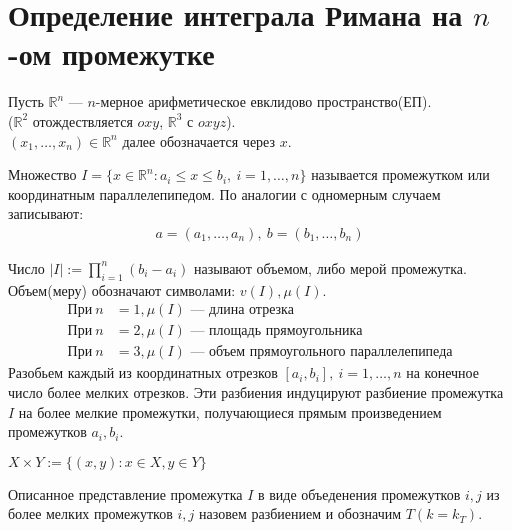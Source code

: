 \section{Определение интеграла Римана на $n$-ом промежутке}
Пусть $\mathbb{R}^n$ --- $n$-мерное арифметическое евклидово пространство(ЕП).
\\ ($\mathbb{R}^2$ отождествляется $oxy$, $\mathbb{R}^3$ с $oxyz$).\\
$(x_1, \dots, x_n) \in \mathbb{R}^n$ далее обозначается через $x$.

\begin{definition}
  Множество $I = \{x \in \mathbb{R}^n : a_i \leq x \leq b_i, \ i = 1, \dots, n\}$
  называется промежутком или координатным параллелепипедом. По аналогии с
  одномерным случаем записывают:
  \begin{gather*}
    a = (a_1, \dots, a_n), \ b = (b_1, \dots, b_n)
  \end{gather*}
\end{definition}

\begin{definition}
  Число $|I| := \prod\limits_{i=1}^{n} (b_i - a_i)$ называют объемом, либо мерой
  промежутка. \\
  Объем(меру) обозначают символами: $v(I), \mu(I)$.
  \begin{align*}
    \text{При} \ n &= 1, \mu(I) \text{ --- длина отрезка} \\
    \text{При} \ n &= 2, \mu(I) \text{ --- площадь прямоугольника} \\
    \text{При} \ n &= 3, \mu(I) \text{ --- объем прямоугольного параллелепипеда}
  \end{align*}
  Разобьем каждый из координатных отрезков $[a_i, b_i], \ i = 1, \dots, n$ на
  конечное число более мелких отрезков. Эти разбиения индуцируют разбиение
  промежутка $I$ на более мелкие промежутки, получающиеся прямым произведением
  промежутков $a_i, b_i$.
\end{definition}

\begin{definition}
  $X \times Y := \{(x, y) : x \in X, y \in Y \}$
\end{definition}

\begin{definition}
  Описанное представление промежутка $I$ в виде объеденения промежутков $i, j$
  из более мелких промежутков $i, j$ назовем разбиением и обозначим $T(k =
  k_T)$.
\end{definition}

